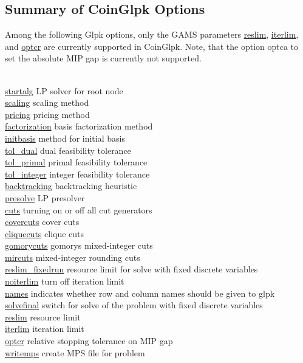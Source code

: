 \subsection{Summary of CoinGlpk Options}

Among the following Glpk options, only the GAMS parameters \hyperlink{glpkreslim}{reslim}, \hyperlink{glpkiterlim}{iterlim}, and \hyperlink{glpkoptcr}{optcr} are currently supported in CoinGlpk.
Note, that the option optca to set the absolute MIP gap is currently not supported.

\begin{tabbing}
\hspace {1.0in} \= \\
\hyperlink{glpkstartalg}
{startalg} \> LP solver for root node \\
\hyperlink{glpkscaling}
{scaling} \> scaling method \\
\hyperlink{pricing}
{pricing} \> pricing method \\
\hyperlink{factorization}
{factorization} \> basis factorization method \\
\hyperlink{initbasis}
{initbasis} \> method for initial basis \\
\hyperlink{glpktol_dual}
{tol\_dual} \> dual feasibility tolerance \\
\hyperlink{glpktol_primal}
{tol\_primal} \> primal feasibility tolerance \\
\hyperlink{glpktol_integer}
{tol\_integer} \> integer feasibility tolerance \\
\hyperlink{backtracking}
{backtracking} \> backtracking heuristic \\
\hyperlink{glpkpresolve}
{presolve} \> LP presolver \\
\hyperlink{glpkcuts}
{cuts} \> turning on or off all cut generators \\
\hyperlink{glpkcovercuts}
{covercuts} \> cover cuts \\
\hyperlink{glpkcliquecuts}
{cliquecuts} \> clique cuts \\
\hyperlink{glpkgomorycuts}
{gomorycuts} \> gomorys mixed-integer cuts \\
\hyperlink{glpkmircuts}
{mircuts} \> mixed-integer rounding cuts \\
\hyperlink{reslim_fixedrun}
{reslim\_fixedrun} \> resource limit for solve with fixed discrete variables \\
\hyperlink{noiterlim}
{noiterlim} \> turn off iteration limit \\
\hyperlink{glpknames}
{names} \> indicates whether row and column names should be given to glpk \\
\hyperlink{glpksolvefinal}
{solvefinal} \> switch for solve of the problem with fixed discrete variables \\
\hyperlink{glpkreslim}
{reslim} \> resource limit \\
\hyperlink{glpkiterlim}
{iterlim} \> iteration limit \\
\hyperlink{glpkoptcr}
{optcr} \> relative stopping tolerance on MIP gap \\
\hyperlink{glpkwritemps}
{writemps} \> create MPS file for problem \\
\end{tabbing}

